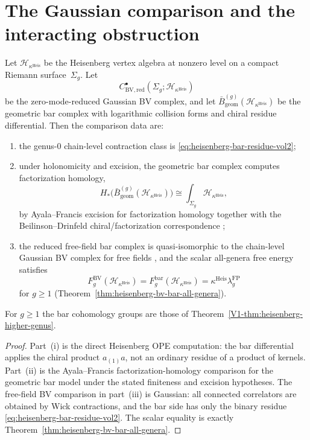 \section{The Gaussian comparison and the interacting obstruction}

\begin{proposition}
\label{prop:heisenberg-gaussian-bv-bar-package}
Let $\mathcal{H}_{\kappa^{\mathrm{Heis}}}$ be the Heisenberg vertex
algebra at nonzero level on a compact Riemann surface~$\Sigma_g$.
Let
\[
C^\bullet_{\mathrm{BV,red}}
(\Sigma_g;\mathcal{H}_{\kappa^{\mathrm{Heis}}})
\]
be the zero-mode-reduced Gaussian BV complex, and let
$\bar{B}^{(g)}_{\mathrm{geom}}
(\mathcal{H}_{\kappa^{\mathrm{Heis}}})$ be the geometric bar complex
with logarithmic collision forms and chiral residue differential.
Then the comparison data are:
\begin{enumerate}[label=\textup{(\roman*)}]
\item the genus-$0$ chain-level contraction class is
 \eqref{eq:heisenberg-bar-residue-vol2};
\item under holonomicity and excision, the geometric bar complex
 computes factorization homology,
 \[
 H_*\bigl(\bar{B}^{(g)}_{\mathrm{geom}}
 (\mathcal{H}_{\kappa^{\mathrm{Heis}}})\bigr)
 \cong
 \int_{\Sigma_g}\mathcal{H}_{\kappa^{\mathrm{Heis}}},
 \]
 by Ayala--Francis excision for factorization homology
 \cite[Theorem~5.1]{AF15} together with the
 Beilinson--Drinfeld chiral/factorization correspondence
 \cite[\S3.4]{BD04};
\item the reduced free-field bar complex is quasi-isomorphic to the
 chain-level Gaussian BV complex for free fields
 \cite[Ch.~4, Thm.~4.4.1]{CG17}, and the scalar
 all-genera free energy satisfies
 \[
 F_g^{\mathrm{BV}}(\mathcal{H}_{\kappa^{\mathrm{Heis}}})
 =
 F_g^{\mathrm{bar}}(\mathcal{H}_{\kappa^{\mathrm{Heis}}})
 =
 \kappa^{\mathrm{Heis}}\lambda_g^{\mathrm{FP}}
 \]
 for $g\geq 1$
 (Theorem~\ref{thm:heisenberg-bv-bar-all-genera}).
\end{enumerate}
For $g\geq 1$ the bar cohomology groups are those of
Theorem~\ref{V1-thm:heisenberg-higher-genus}.
\end{proposition}

\begin{proof}
Part~\textup{(i)} is the direct Heisenberg OPE computation: the
bar differential applies the chiral product $a_{(1)}a$, not an
ordinary residue of a product of kernels.  Part~\textup{(ii)} is the
Ayala--Francis factorization-homology comparison for the geometric
bar model under the stated finiteness and excision hypotheses.  The
free-field BV comparison in part~\textup{(iii)} is Gaussian: all
connected correlators are obtained by Wick contractions, and the
bar side has only the binary residue \eqref{eq:heisenberg-bar-residue-vol2}.
The scalar equality is exactly Theorem~\ref{thm:heisenberg-bv-bar-all-genera}.
\end{proof}

